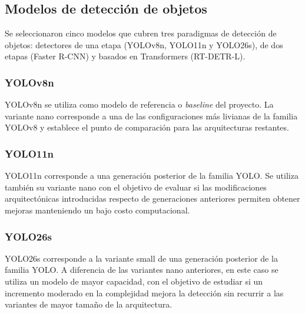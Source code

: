 \documentclass[conference]{IEEEtran}
\begin{document}
\subsection{Modelos de detección de objetos}


Se seleccionaron cinco modelos que cubren tres paradigmas de detección de
objetos: detectores de una etapa (YOLOv8n, YOLO11n y YOLO26s), de dos etapas
(Faster R-CNN) y basados en Transformers (RT-DETR-L).


\subsubsection{YOLOv8n}

YOLOv8n \cite{b5} se utiliza como modelo de referencia o \textit{baseline}
del proyecto. La variante nano corresponde a una de las configuraciones más
livianas de la familia YOLOv8 y establece el punto de comparación para las
arquitecturas restantes.


\subsubsection{YOLO11n}

YOLO11n corresponde a una generación posterior de la familia YOLO. Se utiliza
también su variante nano con el objetivo de evaluar si las modificaciones
arquitectónicas introducidas respecto de generaciones anteriores permiten
obtener mejoras manteniendo un bajo costo computacional.


\subsubsection{YOLO26s}

YOLO26s corresponde a la variante small de una generación posterior de la
familia YOLO. A diferencia de las variantes nano anteriores, en este caso se
utiliza un modelo de mayor capacidad, con el objetivo de estudiar si un
incremento moderado en la complejidad mejora la detección sin recurrir a las
variantes de mayor tamaño de la arquitectura.
\end{document}
